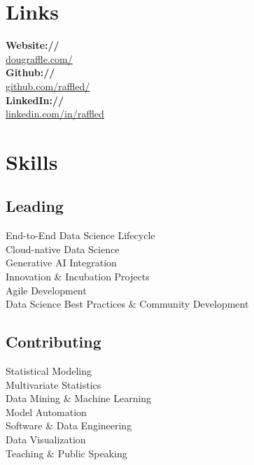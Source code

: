 \documentclass[letterpaper]{deedy-resume} %
\begin{document}
\begin{minipage}[t]{0.3\textwidth}
  \section{Links} 
  {\bf Website://}\\ \href{http://www.dougraffle.com/}{dougraffle.com/}\\
  {\bf Github://}\\ \href{http://github.com/raffled/}{github.com/raffled/}\\
  {\bf LinkedIn://}\\ \href{https://www.linkedin.com/in/raffled}{linkedin.com/in/raffled} \\
  \sectionspace %
  \sectionspace

  \section{Skills}
  \subsection{Leading}
  End-to-End Data Science Lifecycle\\
  Cloud-native Data Science\\
  Generative AI Integration\\
  Innovation \& Incubation Projects\\
  Agile Development\\
  Data Science Best Practices \& Community Development\\
  
  \sectionspace
  
  \subsection{Contributing}
  Statistical Modeling\\
  Multivariate Statistics\\
  Data Mining \& Machine Learning\\
  Model Automation\\
  Software \& Data Engineering\\
  Data Visualization\\
  Teaching \& Public Speaking\\

  \sectionspace %
  \vspace{3pt}


\end{minipage}
\end{document}
